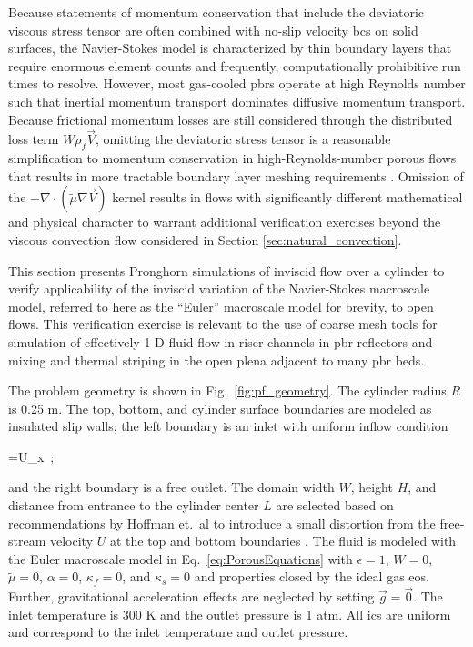 Because statements of momentum conservation that include the deviatoric viscous stress tensor are often combined with no-slip velocity \glspl{bc} on solid surfaces, the Navier-Stokes model is characterized by thin boundary layers that require enormous element counts and frequently, computationally prohibitive run times to resolve. However, most gas-cooled \glspl{pbr} operate at high Reynolds number such that inertial momentum transport dominates diffusive momentum transport. Because frictional momentum losses are still considered through the distributed loss term \(W\rho_f\vec{V}\), omitting the deviatoric stress tensor is a reasonable simplification to momentum conservation in high-Reynolds-number porous flows that results in more tractable boundary layer meshing requirements \cite{kececioglu}. Omission of the \(-\nabla\cdot(\tilde{\mu}\nabla\vec{V})\) kernel results in flows with significantly different mathematical and physical character to warrant additional verification exercises beyond the viscous convection flow considered in Section \ref{sec:natural_convection}.

This section presents Pronghorn simulations of inviscid flow over a cylinder to verify applicability of the inviscid variation of the Navier-Stokes macroscale model, referred to here as the ``Euler'' macroscale model for brevity, to open flows. This verification exercise is relevant to the use of coarse mesh tools for simulation of effectively 1-D fluid flow in riser channels in \gls{pbr} reflectors and mixing and thermal striping in the open plena adjacent to many \gls{pbr} beds. 

The problem geometry is shown in Fig.\ \ref{fig:pf_geometry}. The cylinder radius \(R\) is 0.25 \si{\meter}. The top, bottom, and cylinder surface boundaries are modeled as insulated slip walls; the left boundary is an inlet with uniform inflow condition

\beq
\label{eq:FreeStreamV}
=U_x\ ;
\eeq

\noindent and the right boundary is a free outlet. The domain width \(W\), height \(H\), and distance from entrance to the cylinder center \(L\) are selected based on recommendations by Hoffman et.\ al to introduce a small distortion from the free-stream velocity \(U\) at the top and bottom boundaries \cite{hoffman_2011}. The fluid is modeled with the Euler macroscale model in Eq.\ \eqref{eq:PorousEquations} with \(\epsilon=1\), \(W=0\), \(\tilde{\mu}=0\), \(\alpha=0\), \(\kappa_f=0\), and \(\kappa_s=0\) and properties closed by the ideal gas \gls{eos}. Further, gravitational acceleration effects are neglected by setting \(\vec{g}=\vec{0}\). The inlet temperature is 300 \si{\kelvin} and the outlet pressure is 1 atm. All \glspl{ic} are uniform and correspond to the inlet temperature and outlet pressure.

